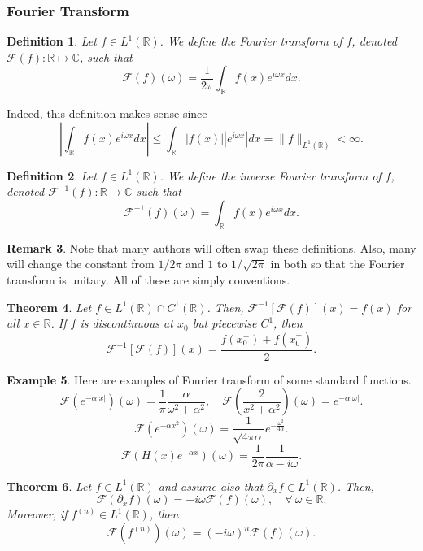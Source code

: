 \documentclass{article}
\newtheorem{theorem}{Theorem}[subsection] %
\newtheorem{definition}[theorem]{Definition}
\theoremstyle{definition}
\newtheorem{example}[theorem]{Example}
\theoremstyle{definition}
\newtheorem{remark}[theorem]{Remark}
\newcommand{\R}{\mathbb{R}}
\begin{document}
\subsubsection{Fourier Transform}
\begin{definition}
    Let $f\in L^1(\R)$. We define the Fourier transform of $f$, denoted $\mathcal{F}(f):\R\mapsto \mathbb{C}$, such that
    $$\mathcal{F}(f)(\omega)=\frac{1}{2\pi}\int_{\R}f(x)e^{i\omega x}dx.$$
\end{definition}
Indeed, this definition makes sense since
$$\left|\int_{\R}f(x)e^{i\omega x}dx\right|\leq \int_{\R}|f(x)||e^{i\omega x}|dx=\|f\|_{L^1(\R)}<\infty.$$
\begin{definition}
    Let $f\in L^1(\R)$. We define the inverse Fourier transform of $f$, denoted $\mathcal{F}^{-1}(f):\R\mapsto \mathbb{C}$ such that
    $$\mathcal{F}^{-1}(f)(\omega)=\int_{\R}f(x)e^{i\omega x}dx.$$
\end{definition}
\begin{remark}
    Note that many authors will often swap these definitions. Also, many will change the constant from $1/2\pi$ and $1$ to $1/\sqrt{2\pi}$ in both so that the Fourier transform is unitary. All of these are simply conventions.
\end{remark}
\begin{theorem}
    Let $f\in L^1(\R)\cap C^1(\R)$. Then, $\mathcal{F}^{-1}[\mathcal{F}(f)](x)=f(x)$ for all $x\in \R$. If $f$ is discontinuous at $x_0$ but piecewise $C^1$, then
    $$\mathcal{F}^{-1}[\mathcal{F}(f)](x)=\frac{f(x_0^{-})+f(x_0^{+})}{2}.$$
\end{theorem}
\begin{example}
    Here are examples of Fourier transform of some standard functions.
    $$\mathcal{F}(e^{-\alpha|x|})(\omega)=\frac{1}{\pi}\frac{\alpha}{\omega^2+\alpha^2},\quad \mathcal{F}\left(\frac{2}{x^2+\alpha^2}\right)(\omega)=e^{-\alpha|\omega|}.$$
    $$\mathcal{F}(e^{-\alpha x^2})(\omega)=\frac{1}{\sqrt{4\pi \alpha}}e^{-\frac{\omega^2}{4\alpha}}.$$
    $$\mathcal{F}(H(x)e^{-\alpha x})(\omega)=\frac{1}{2\pi}\frac{1}{\alpha-i\omega}.$$
\end{example}
\begin{theorem}
    Let $f\in L^1(\R)$ and assume also that $\partial_{x}f\in L^1(\R)$. Then,
    $$\mathcal{F}(\partial_x f)(\omega)=-i\omega \mathcal{F}(f)(\omega),\quad \forall\:\omega\in \R.$$
    Moreover,
    if $f^{(n)}\in L^1(\R)$, then
    $$\mathcal{F}(f^{(n)})(\omega)=(-i\omega)^{n}\mathcal{F}(f)(\omega).$$
\end{theorem}
\end{document}
